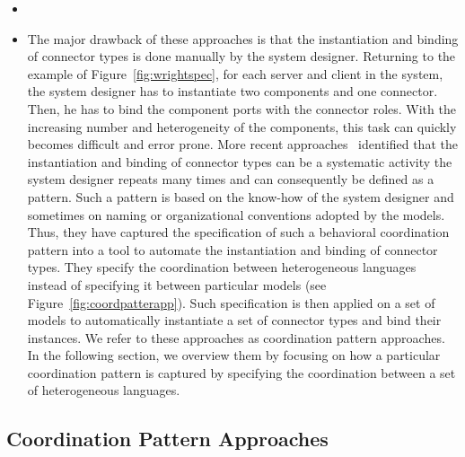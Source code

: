 \begin{itemize}
			\item {}
			\item The major drawback of these approaches is that the instantiation and binding of connector types is done manually by the system designer. Returning to the example of Figure~\ref{fig:wrightspec}, for each server and client in the system, the system designer has to instantiate two components and one connector. Then, he has to bind the component ports with the connector roles. With the increasing number and heterogeneity of the components, this task can quickly becomes difficult and error prone. More recent approaches~\cite{dinatale,mascotbib,ptoleframebib,modhelxbib} identified that the instantiation and binding of connector types can be a systematic activity the system designer repeats many times and can consequently be defined as a pattern. Such a pattern is based on the know-how of the system designer and sometimes on naming or organizational conventions adopted by the models. Thus, they have captured the specification of such a behavioral coordination pattern into a tool to automate the instantiation and binding of connector types. They specify the coordination between heterogeneous languages instead of specifying it between particular models (see Figure~\ref{fig:coordpatterapp}). Such specification is then applied on a set of models to automatically instantiate a set of connector types and bind their instances. We refer to these approaches as coordination pattern approaches. In the following section, we overview them by focusing on how a particular coordination pattern is captured by specifying the coordination between a set of heterogeneous languages.
         
         \end{itemize}
         
         \subsection{Coordination Pattern Approaches}
         
